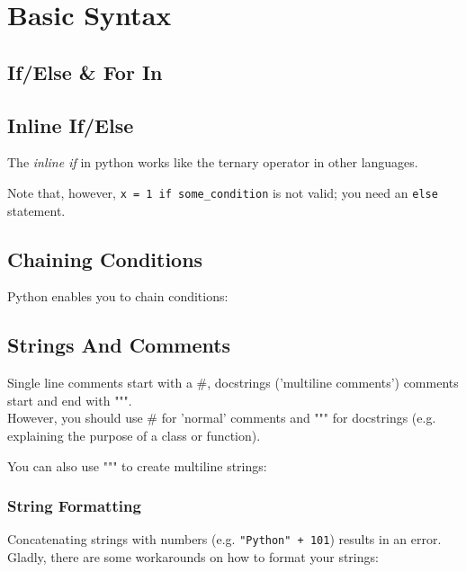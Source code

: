 \section{Basic Syntax}

  \subsection{If/Else \& For In}

  \subsection{Inline If/Else}
    The \textit{inline if} in python works like the ternary operator in other languages.
    
    Note that, however, \texttt{x = 1 if some_condition} is not valid; you need an \texttt{else} statement.

  \subsection{Chaining Conditions}
    Python enables you to chain conditions:
    

  \subsection{Strings And Comments}
    Single line comments start with a \#, docstrings ('multiline comments') comments start and end with """. \\
    However, you should use \# for 'normal' comments and """ for docstrings (e.g. explaining the purpose of a class or function).
    
    You can also use """ to create multiline strings:
    
  
    \subsubsection{String Formatting}
      Concatenating strings with numbers (e.g. \texttt{"Python" + 101}) results in an error. \\
      Gladly, there are some workarounds on how to format your strings:
    

